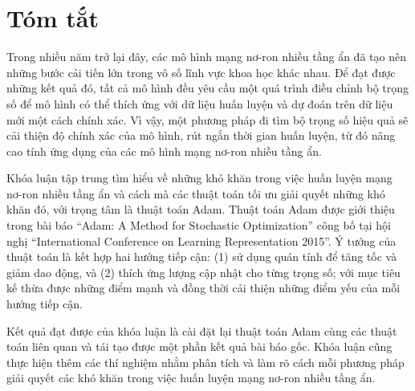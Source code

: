 \chapter*{Tóm tắt}
\label{summary}

Trong nhiều năm trở lại đây, các mô hình mạng nơ-ron nhiều tầng ẩn đã tạo nên những bước cải tiến lớn trong vô số lĩnh vực khoa học khác nhau. Để đạt được những kết quả đó, tất cả mô hình đều yêu cầu một quá trình điều chỉnh bộ trọng số để mô hình có thể thích ứng với dữ liệu huấn luyện và dự đoán trên dữ liệu mới một cách chính xác. Vì vậy, một phương pháp đi tìm bộ trọng số hiệu quả sẽ cải thiện độ chính xác của mô hình, rút ngắn thời gian huấn luyện, từ đó nâng cao tính ứng dụng của các mô hình mạng nơ-ron nhiều tầng ẩn.

Khóa luận tập trung tìm hiểu về những khó khăn trong việc huấn luyện mạng nơ-ron nhiều tầng ẩn và cách mà các thuật toán tối ưu giải quyết những khó khăn đó, với trọng tâm là thuật toán Adam. Thuật toán Adam được giới thiệu trong bài báo ``Adam: A Method for Stochastic Optimization'' công bố tại hội nghị ``International Conference on Learning Representation 2015''. Ý tưởng của thuật toán là kết hợp hai hướng tiếp cận: (1) sử dụng quán tính để tăng tốc và giảm dao động, và (2) thích ứng lượng cập nhật cho từng trọng số; với mục tiêu kế thừa được những điểm mạnh và đồng thời cải thiện những điểm yếu của mỗi hướng tiếp cận.

Kết quả đạt được của khóa luận là cài đặt lại thuật toán Adam cùng các thuật toán liên quan và tái tạo được một phần kết quả bài báo gốc. Khóa luận cũng thực hiện thêm các thí nghiệm nhằm phân tích và làm rõ cách mỗi phương pháp giải quyết các khó khăn trong việc huấn luyện mạng nơ-ron nhiều tầng ẩn.